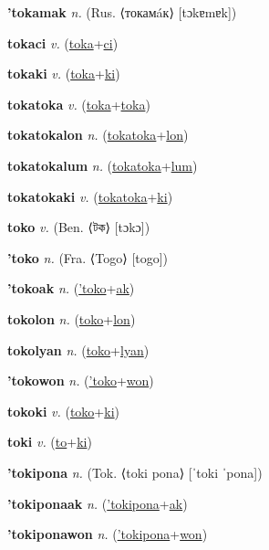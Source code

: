 \textbf{\hypertarget{'tokamak}{'tokamak}} \textit{n.} (Rus. ⟨токамáк⟩ [tɔkɐmɐk])


\textbf{\hypertarget{tokaci}{tokaci}} \textit{v.} (\hyperlink{toka}{toka}+\allowbreak \hyperlink{ci}{ci})


\textbf{\hypertarget{tokaki}{tokaki}} \textit{v.} (\hyperlink{toka}{toka}+\allowbreak \hyperlink{ki}{ki})


\textbf{\hypertarget{tokatoka}{tokatoka}} \textit{v.} (\hyperlink{toka}{toka}+\allowbreak \hyperlink{toka}{toka})


\textbf{\hypertarget{tokatokalon}{tokatokalon}} \textit{n.} (\hyperlink{tokatoka}{tokatoka}+\allowbreak \hyperlink{lon}{lon})


\textbf{\hypertarget{tokatokalum}{tokatokalum}} \textit{n.} (\hyperlink{tokatoka}{tokatoka}+\allowbreak \hyperlink{lum}{lum})


\textbf{\hypertarget{tokatokaki}{tokatokaki}} \textit{v.} (\hyperlink{tokatoka}{tokatoka}+\allowbreak \hyperlink{ki}{ki})


\textbf{\hypertarget{toko}{toko}} \textit{v.} (Ben. ⟨{\bengali{}টক}⟩ [tɔkɔ])


\textbf{\hypertarget{'toko}{'toko}} \textit{n.} (Fra. ⟨Togo⟩ [togo])


\textbf{\hypertarget{'tokoak}{'tokoak}} \textit{n.} (\hyperlink{'toko}{'toko}+\allowbreak \hyperlink{ak}{ak})


\textbf{\hypertarget{tokolon}{tokolon}} \textit{n.} (\hyperlink{toko}{toko}+\allowbreak \hyperlink{lon}{lon})


\textbf{\hypertarget{tokolyan}{tokolyan}} \textit{n.} (\hyperlink{toko}{toko}+\allowbreak \hyperlink{lyan}{lyan})


\textbf{\hypertarget{'tokowon}{'tokowon}} \textit{n.} (\hyperlink{'toko}{'toko}+\allowbreak \hyperlink{won}{won})


\textbf{\hypertarget{tokoki}{tokoki}} \textit{v.} (\hyperlink{toko}{toko}+\allowbreak \hyperlink{ki}{ki})


\textbf{\hypertarget{toki}{toki}} \textit{v.} (\hyperlink{to}{to}+\allowbreak \hyperlink{ki}{ki})


\textbf{\hypertarget{'tokipona}{'tokipona}} \textit{n.} (Tok. ⟨toki pona⟩ [ˈtoki ˈpona])


\textbf{\hypertarget{'tokiponaak}{'tokiponaak}} \textit{n.} (\hyperlink{'tokipona}{'tokipona}+\allowbreak \hyperlink{ak}{ak})


\textbf{\hypertarget{'tokiponawon}{'tokiponawon}} \textit{n.} (\hyperlink{'tokipona}{'tokipona}+\allowbreak \hyperlink{won}{won})


